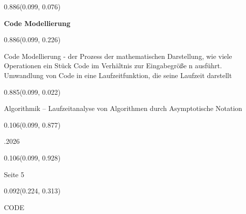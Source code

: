 \documentclass[aspectratio=169]{beamer}
\begin{document}
\begin{frame}[fragile]
  \begin{textblock}{0.886}(0.099, 0.076)
    \begin{minipage}[t][0.131\paperheight]{\linewidth}
      \textbf{Code Modellierung}
    \end{minipage}
  \end{textblock}
  
  \begin{textblock}{0.886}(0.099, 0.226)
    \begin{minipage}[b][0.63\paperheight]{\linewidth}
      Code Modellierung - der Prozess der mathematischen Darstellung, wie viele Operationen ein Stück Code im Verhältnis zur Eingabegröße n ausführt.
      Umwandlung von Code in eine Laufzeitfunktion, die seine Laufzeit darstellt
    \end{minipage}
  \end{textblock}
  
  \begin{textblock}{0.885}(0.099, 0.022)
    \begin{minipage}[b][0.031\paperheight]{\linewidth}
      \raggedright
      \fontsize{3}{3.3}\selectfont Algorithmik – Laufzeitanalyse von Algorithmen durch Asymptotische Notation
    \end{minipage}
  \end{textblock}
  
  \begin{textblock}{0.106}(0.099, 0.877)
    \begin{minipage}[b][0.026\paperheight]{\linewidth}
      \raggedright
      \fontsize{3}{3.3}.2026
    \end{minipage}
  \end{textblock}
  
  \begin{textblock}{0.106}(0.099, 0.928)
    \begin{minipage}[b][0.031\paperheight]{\linewidth}
      \raggedright
      \fontsize{3}{3.3}\selectfont Seite 5
    \end{minipage}
  \end{textblock}
  
  \begin{textblock}{0.092}(0.224, 0.313)
    \begin{minipage}[t][0.161\paperheight]{\linewidth}
      CODE
    \end{minipage}
  \end{textblock}
  

\end{frame}
\end{document}
